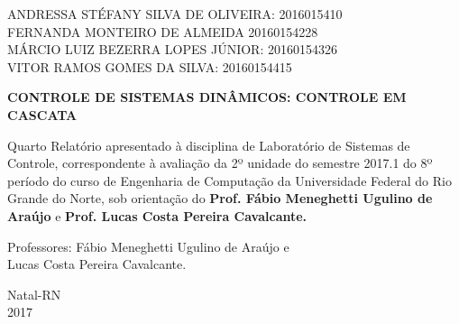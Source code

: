 \documentclass[a4paper,12pt]{article}
\begin{document}
\newpage


\thispagestyle{empty}

\begin{center}
\begin{normalsize}
ANDRESSA STÉFANY SILVA DE OLIVEIRA: 2016015410\\
\vspace{0.8cm}
FERNANDA MONTEIRO DE ALMEIDA 20160154228\\
\vspace{0.8cm}
MÁRCIO LUIZ BEZERRA LOPES JÚNIOR: 20160154326\\
\vspace{0.8cm}
VITOR RAMOS GOMES DA SILVA: 20160154415\\

\end{normalsize}
\end{center}
\vspace{3cm}

{\bf{\large {\centering CONTROLE DE SISTEMAS DINÂMICOS: CONTROLE EM CASCATA\\}}}

\vspace{4cm}

\begin{adjustwidth}{7.5cm}{0cm}

{\normalsize
Quarto Relatório apresentado à disciplina de
Laboratório de Sistemas de Controle, correspondente à
avaliação da 2º unidade do semestre 2017.1 do 8º período
do curso de Engenharia de Computação da
Universidade Federal do Rio Grande do Norte, sob
orientação do {\bf Prof. Fábio Meneghetti Ugulino de
Araújo} e {\bf Prof. Lucas Costa Pereira Cavalcante.}

}

\end{adjustwidth}

\vspace{2cm}

\begin{center}

Professores:  Fábio Meneghetti Ugulino de Araújo e\\
Lucas Costa Pereira Cavalcante.

\vspace{2.5cm}

{\large Natal-RN\\
2017}

\end{center}
\end{document}

